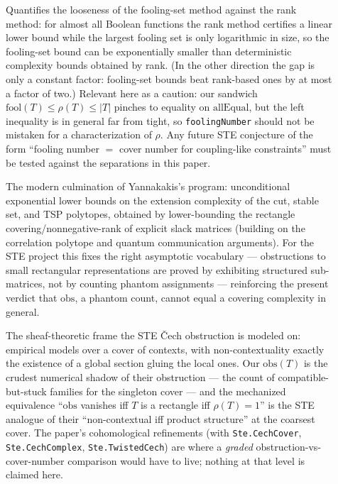 \documentclass[11pt]{article}
\newcommand{\ste}[1]{\texttt{#1}}
\newcommand{\cech}{\v{C}ech}
\begin{document}
\begin{description}
\item[\citet{dietzfelbinger1996comparison}]
Quantifies the looseness of the fooling-set method against the rank
method: for almost all Boolean functions the rank method certifies a
linear lower bound while the largest fooling set is only logarithmic in
size, so the fooling-set bound can be exponentially smaller than
deterministic complexity bounds obtained by rank. (In the other
direction the gap is only a constant factor: fooling-set bounds beat
rank-based ones by at most a factor of two.) Relevant
here as a caution: our sandwich
$\mathrm{fool}(T)\le\rho(T)\le|T|$ pinches to equality on
$\mathrm{allEqual}$, but the left inequality is in general far from
tight, so \ste{foolingNumber} should not be mistaken for a
characterization of $\rho$. Any future STE conjecture of the form
``fooling number $=$ cover number for coupling-like constraints'' must
be tested against the separations in this paper.

\item[\citet{fiorini2015exponential}]
The modern culmination of Yannakakis's program: unconditional
exponential lower bounds on the extension complexity of the cut, stable
set, and TSP polytopes, obtained by lower-bounding the rectangle
covering/nonnegative-rank of explicit slack matrices (building on the
correlation polytope and quantum communication arguments). For the STE
project this fixes the right asymptotic vocabulary --- obstructions to
small rectangular representations are proved by exhibiting structured
sub-matrices, not by counting phantom assignments --- reinforcing the
present verdict that $\mathrm{obs}$, a phantom count, cannot equal a
covering complexity in general.

\item[\citet{abramsky2011sheaf}]
The sheaf-theoretic frame the STE \cech{} obstruction is modeled on:
empirical models over a cover of contexts, with non-contextuality
exactly the existence of a global section gluing the local ones. Our
$\mathrm{obs}(T)$ is the crudest numerical shadow of their obstruction
--- the count of compatible-but-stuck families for the singleton cover
--- and the mechanized equivalence ``$\mathrm{obs}$ vanishes iff $T$ is
a rectangle iff $\rho(T)=1$'' is the STE analogue of their
``non-contextual iff product structure'' at the coarsest cover. The
paper's cohomological refinements (with \ste{Ste.CechCover},
\ste{Ste.CechComplex}, \ste{Ste.TwistedCech}) are where a
\emph{graded} obstruction-vs-cover-number comparison would have to
live; nothing at that level is claimed here.


\end{description}
\end{document}
